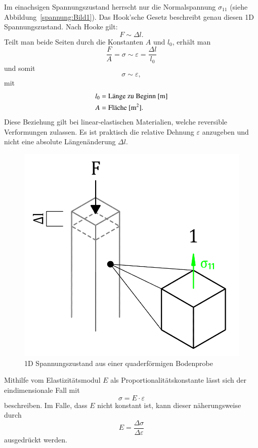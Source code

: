 Im einachsigen Spannungszustand herrscht nur die Normalspannung $\sigma_{11}$ (siehe Abbildung~\ref{spannung:Bild1}).
Das Hook'sche Gesetz beschreibt genau diesen 1D Spannungszustand.
Nach Hooke gilt:
\[
F
\sim
\Delta l
.
\]
Teilt man beide Seiten durch die Konstanten $A$ und $l_0$, erhält man
\[
\frac{F}{A}
=
\sigma
\sim
\varepsilon
=
\frac{\Delta l}{l_0}
\]
und somit
\[
\sigma
\sim
\varepsilon
,
\]
mit
\begin{align*}
	l_0 &= \text{Länge zu Beginn [\si{\meter}]} \\
	  A &= \text{Fläche [\si{\meter\squared}].}
\end{align*}
Diese Beziehung gilt bei linear-elastischen Materialien, welche reversible Verformungen zulassen.
Es ist praktisch die relative Dehnung $\varepsilon$ anzugeben und nicht eine absolute Längenänderung $\Delta l$.
\begin{figure}
	\centering
	\includegraphics[width=0.35\linewidth,keepaspectratio]{papers/spannung/Grafiken/Bild1.png}
	\caption{1D Spannungszustand aus einer quaderförmigen Bodenprobe}
	\label{fig:Bild1}
\end{figure}
Mithilfe vom Elastizitätsmodul $E$ als Proportionalitätskonstante lässt sich der eindimensionale Fall mit
\[
\sigma
=
E\cdot\varepsilon
\]
beschreiben.
Im Falle, dass $E$ nicht konstant ist, kann dieser näherungsweise durch
\[
E
=
\frac{\Delta\sigma}{\Delta\varepsilon}
\]
ausgedrückt werden.